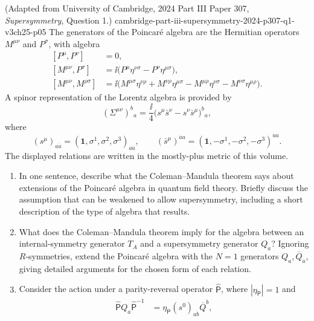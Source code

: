 \begin{enumerate}
    {(Adapted from University of Cambridge, 2024 Part III Paper 307, \emph{Supersymmetry}, Question 1.)}
    {cambridge-part-iii-supersymmetry-2024-p307-q1-v3ch25-p05}
The generators of the Poincar\'e algebra are the Hermitian operators
  \(M^{\mu\nu}\) and \(P^\sigma\), with algebra
  \[
  \begin{aligned}
    [P^\mu,P^\nu]&=0,\\
    [M^{\mu\nu},P^\sigma]
      &=\ii\bigl(P^\mu\eta^{\nu\sigma}
               -P^\nu\eta^{\mu\sigma}\bigr),\\
    [M^{\mu\nu},M^{\rho\sigma}]
      &=\ii\bigl(
          M^{\mu\sigma}\eta^{\nu\rho}
         +M^{\nu\rho}\eta^{\mu\sigma}
         -M^{\mu\rho}\eta^{\nu\sigma}
         -M^{\nu\sigma}\eta^{\mu\rho}
        \bigr).
  \end{aligned}
  \]
  A spinor representation of the Lorentz algebra is provided by
  \[
    (\Sigma^{\mu\nu})^b{}_a
      =\frac{\ii}{4}
        \bigl(s^\mu\bar s^\nu-s^\nu\bar s^\mu\bigr)^b{}_a,
  \]
  where
  \[
    (s^\mu)_{a\dot a}
       =(\mathbf 1,\sigma^1,\sigma^2,\sigma^3)_{a\dot a},
    \qquad
    (\bar s^\mu)^{\dot a a}
       =(\mathbf 1,-\sigma^1,-\sigma^2,-\sigma^3)^{\dot a a}.
  \]
  The displayed relations are written in the mostly-plus metric of this
  volume.
  \begin{enumerate}
    \item In one sentence, describe what the Coleman--Mandula theorem says
      about extensions of the Poincar\'e algebra in quantum field theory.
      Briefly discuss the assumption that can be weakened to allow
      supersymmetry, including a short description of the type of algebra
      that results.
    \item What does the Coleman--Mandula theorem imply for the algebra
      between an internal-symmetry generator \(T_A\) and a supersymmetry
      generator \(Q_a\)?  Ignoring \(R\)-symmetries, extend the
      Poincar\'e algebra with the \(N=1\) generators
      \(Q_a,\overline Q_{\dot a}\), giving detailed arguments for the
      chosen form of each relation.
    \item Consider the action under a parity-reversal operator
      \(\widehat{\mathsf P}\), where \(|\eta_{\mathsf P}|=1\) and
      \[
      \begin{aligned}
        \widehat{\mathsf P}Q_a\widehat{\mathsf P}^{-1}
          &=\eta_{\mathsf P}(s^0)_{a\dot b}
            \overline Q^{\dot b},\\

\end{aligned}\]
\end{enumerate}
\end{enumerate}
